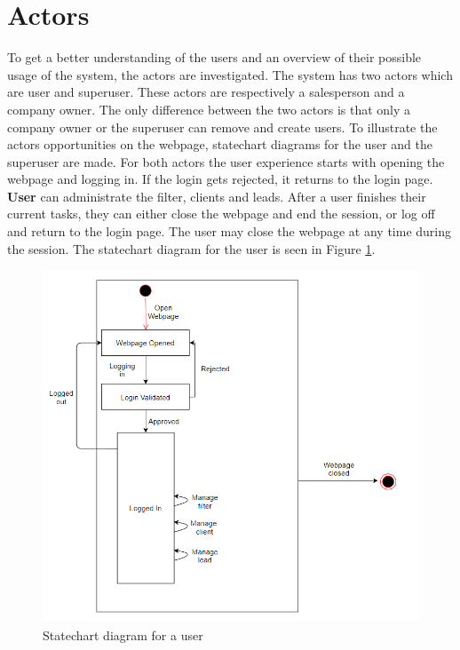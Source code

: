 \section{Actors}
To get a better understanding of the users and an overview of their possible usage of the system, the actors are investigated. The system has two actors which are user and superuser. These actors are respectively a salesperson and a company owner. The only difference between the two actors is that only a company owner or the superuser can remove and create users. To illustrate the actors opportunities on the webpage, statechart diagrams for the user and the superuser are made.
\newline \newline \noindent
For both actors the user experience starts with opening the webpage and logging in. If the login gets rejected, it returns to the login page. \newline \newline \noindent
\textbf{User} can administrate the filter, clients and leads. After a user finishes their current tasks, they can either close the webpage and end the session, or log off and return to the login page. The user may close the webpage at any time during the session. The statechart diagram for the user is seen in Figure \ref{fig:statechartMember}.
\newline
\begin{figure}[H]
    \centering
    \includegraphics[scale=.7, clip]{figures/useCaseMember.png}
    \caption{Statechart diagram for a user}
    \label{fig:statechartMember}
\end{figure}
